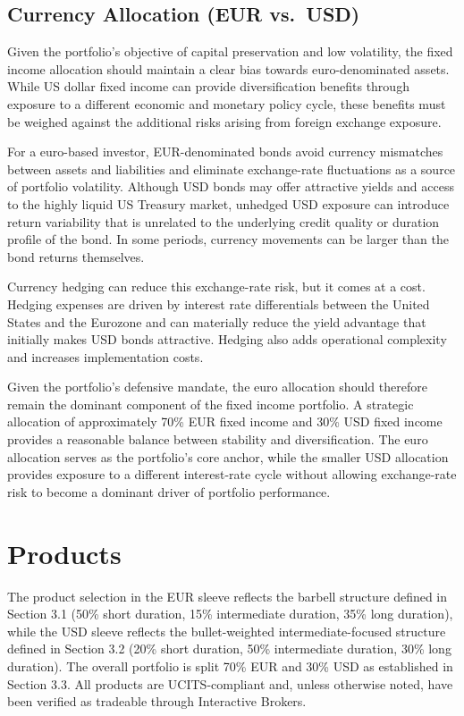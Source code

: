 \documentclass[11pt,a4paper]{article}
\begin{document}
\subsection{Currency Allocation (EUR vs.\ USD)}

Given the portfolio's objective of capital preservation and low volatility, the fixed income allocation should maintain a clear bias towards euro-denominated assets. While US dollar fixed income can provide diversification benefits through exposure to a different economic and monetary policy cycle, these benefits must be weighed against the additional risks arising from foreign exchange exposure.

For a euro-based investor, EUR-denominated bonds avoid currency mismatches between assets and liabilities and eliminate exchange-rate fluctuations as a source of portfolio volatility. Although USD bonds may offer attractive yields and access to the highly liquid US Treasury market, unhedged USD exposure can introduce return variability that is unrelated to the underlying credit quality or duration profile of the bond. In some periods, currency movements can be larger than the bond returns themselves.

Currency hedging can reduce this exchange-rate risk, but it comes at a cost. Hedging expenses are driven by interest rate differentials between the United States and the Eurozone and can materially reduce the yield advantage that initially makes USD bonds attractive. Hedging also adds operational complexity and increases implementation costs.

Given the portfolio's defensive mandate, the euro allocation should therefore remain the dominant component of the fixed income portfolio. A strategic allocation of approximately 70\% EUR fixed income and 30\% USD fixed income provides a reasonable balance between stability and diversification. The euro allocation serves as the portfolio's core anchor, while the smaller USD allocation provides exposure to a different interest-rate cycle without allowing exchange-rate risk to become a dominant driver of portfolio performance.

\section{Products}

The product selection in the EUR sleeve reflects the barbell structure defined in Section 3.1 (50\% short duration, 15\% intermediate duration, 35\% long duration), while the USD sleeve reflects the bullet-weighted intermediate-focused structure defined in Section 3.2 (20\% short duration, 50\% intermediate duration, 30\% long duration). The overall portfolio is split 70\% EUR and 30\% USD as established in Section 3.3. All products are UCITS-compliant and, unless otherwise noted, have been verified as tradeable through Interactive Brokers.
\end{document}
